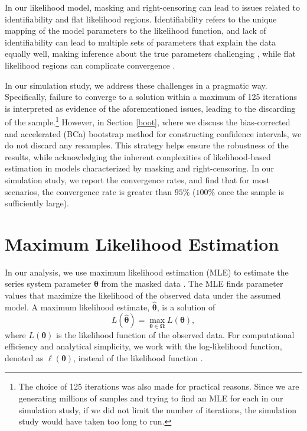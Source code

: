 \documentclass[
]{article}
\theoremstyle{definition}
\theoremstyle{plain}
\theoremstyle{definition}
\theoremstyle{definition}
\theoremstyle{definition}
\theoremstyle{definition}
\theoremstyle{remark}
\begin{document}
In our likelihood model, masking and right-censoring can lead to issues related
to identifiability and flat likelihood regions.
Identifiability refers to the unique mapping of the model parameters to the
likelihood function, and lack of identifiability can lead
to multiple sets of parameters that explain the data equally well, making inference
about the true parameters challenging \citep{lehmann1998theory}, while
flat likelihood regions can complicate convergence \citep{wu1983convergence}.

In our simulation study, we address these challenges in a pragmatic way. Specifically,
failure to converge to a solution within a maximum of 125 iterations is interpreted as
evidence of the aforementioned issues, leading to the discarding of the sample.\footnote{The choice of 125 iterations was also made for practical reasons.
  Since we are generating millions of samples and trying to find an MLE for
  each in our simulation study, if we did not limit the number of iterations, the
  simulation study would have taken too long to run.}
However, in Section \ref{boot}, where we discuss the bias-corrected and
accelerated (BCa) bootstrap method for constructing confidence intervals, we
do not discard any resamples. This strategy helps ensure the robustness of the
results, while acknowledging the inherent complexities of likelihood-based
estimation in models characterized by masking and right-censoring. In our
simulation study, we report the convergence rates, and find that for most
scenarios, the convergence rate is greater than \(95\%\) (\(100\%\) once
the sample is sufficiently large).

\hypertarget{mle}{%
\section{Maximum Likelihood Estimation}\label{mle}}

In our analysis, we use maximum likelihood estimation (MLE) to estimate the series
system parameter \(\boldsymbol{\theta}\) from the masked data \citep{bain1992, casella2002statistical}.
The MLE finds parameter values that maximize the likelihood of the observed data
under the assumed model. A maximum likelihood estimate, \(\hat{\boldsymbol{\theta}}\), is a
solution of
\begin{equation}
\label{eq:mle}
L(\hat{\boldsymbol{\theta}}) = \max_{\boldsymbol{\theta }\in \boldsymbol{\Omega}} L(\boldsymbol{\theta}),
\end{equation}
where \(L(\boldsymbol{\theta})\) is the likelihood function of the observed data. For computational
efficiency and analytical simplicity, we work with the log-likelihood function,
denoted as \(\ell(\boldsymbol{\theta})\), instead of the likelihood function \citep{casella2002statistical}.
\end{document}
